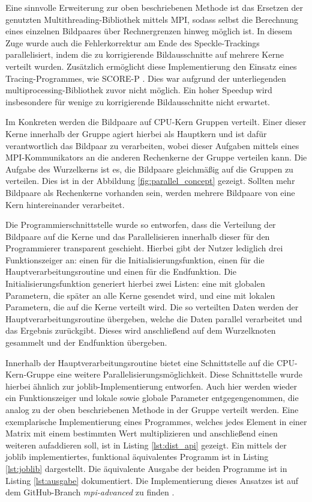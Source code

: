 Eine sinnvolle Erweiterung zur oben beschriebenen Methode ist das Ersetzen der genutzten Mul\-ti\-threa\-ding-Bibliothek mittels MPI, sodass selbst die Berechnung eines einzelnen Bildpaares über Rechnergrenzen hinweg möglich ist. In diesem Zuge wurde auch die Fehlerkorrektur am Ende des Speckle-Trackings parallelisiert, indem die zu korrigierende Bildausschnitte auf mehrere Kerne verteilt wurden. Zusätzlich ermöglicht diese Implementierung den Einsatz eines Tracing-Programmes, wie SCORE-P \cite{KRM+12}. Dies war aufgrund der unterliegenden multiprocessing-Bibliothek zuvor nicht möglich. Ein hoher Speedup wird insbesondere für wenige zu korrigierende Bildausschnitte nicht erwartet. 

Im Konkreten werden die Bildpaare auf \gls{CPU}-Kern Gruppen verteilt. Einer dieser Kerne innerhalb der Gruppe agiert hierbei als Hauptkern und ist dafür verantwortlich das Bildpaar zu verarbeiten, wobei dieser Aufgaben mittels eines \gls{MPI}-Kommunikators an die anderen Rechenkerne der Gruppe verteilen kann. Die Aufgabe des Wurzelkerns ist es, die Bildpaare gleichmäßig auf die Gruppen zu verteilen. Dies ist in der Abbildung \ref{fig:parallel_concept} gezeigt. Sollten mehr Bildpaare als Rechenkerne vorhanden sein, werden mehrere Bildpaare von eine Kern hintereinander verarbeitet. 

Die Programmierschnittstelle wurde so entworfen, dass die Verteilung der Bildpaare auf die Kerne und das Parallelisieren innerhalb dieser für den Programmierer transparent geschieht. Hierbei gibt der Nutzer lediglich drei Funktionszeiger an: einen für die Initialisierungsfunktion, einen für die Hauptverarbeitungsroutine und einen für die Endfunktion. Die Initialisierungsfunktion generiert hierbei zwei Listen: eine mit globalen Parametern, die später an alle Kerne gesendet wird, und eine mit lokalen Parametern, die auf die Kerne verteilt wird. Die so verteilten Daten werden der Hauptverarbeitungsroutine übergeben, welche die Daten parallel verarbeitet und das Ergebnis zurückgibt. Dieses wird anschließend auf dem Wurzelknoten gesammelt und der Endfunktion übergeben. 

Innerhalb der Hauptverarbeitungsroutine bietet eine Schnittstelle auf die \gls{CPU}-Kern-Gruppe eine weitere Parallelisierungsmöglichkeit. Diese Schnittstelle wurde hierbei ähnlich zur joblib-Implementierung entworfen. Auch hier werden wieder ein Funktionszeiger und lokale sowie globale Parameter entgegengenommen, die analog zu der oben beschriebenen Methode in der Gruppe verteilt werden. Eine exemplarische Implementierung eines Programmes, welches jedes Element in einer Matrix mit einem bestimmten Wert multiplizieren und anschließend einen weiteren aufaddieren soll, ist in Listing \ref{lst:dist_api} gezeigt. Ein mittels der joblib implementiertes, funktional äquivalentes Programm ist in Listing \ref{lst:joblib} dargestellt. Die äquivalente Ausgabe der beiden Programme ist in Listing \ref{lst:ausgabe} dokumentiert. Die Implementierung dieses Ansatzes ist auf dem GitHub-Branch \textit{mpi-advanced} zu finden \cite{Coj17}.


